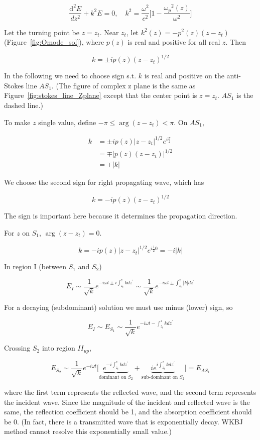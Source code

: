 \documentclass[
  notoc %
]{tufte-book}
\begin{document}
\[
\frac{\mathrm{d}^2 E}{dz^2} +k^2 E = 0,\quad k^2 = \frac{\omega^2}{c^2}\Big[ 1-\frac{{\omega_p}^2(z)}{\omega^2} \Big]
\]

Let the turning point be \(z=z_t\). Near \(z_t\), let
\(k^2(z)=-p^2(z)(z-z_t)\) (Figure~\ref{fig:Omode_sol}), where \(p(z)\)
is real and positive for all real \(z\). Then

\[
k=\pm i p(z)(z-z_t)^{1/2}
\]

In the following we need to choose sign s.t. \(k\) is real and positive
on the anti-Stokes line \(AS_1\). (The figure of complex z plane is the
same as Figure~\ref{fig:stokes_line_Zplane} except that the center point
is \(z=z_t\). \(AS_1\) is the dashed line.)

To make \(z\) single value, define \(-\pi\le\arg{(z-z_t)}<\pi\). On
\(AS_1\),

\[
\begin{aligned}
k &= \pm ip(z)|z-z_t|^{1/2} e^{i\frac{\pi}{2}} \\
&=\mp|p(z)(z-z_t)|^{1/2} \\
&=\mp |k|
\end{aligned}
\]

We choose the second sign for right propagating wave, which has

\[
k=-ip(z)(z-z_t)^{1/2}
\]

The sign is important here because it determines the propagation
direction.

For \(z\) on \(S_1\), \(\arg{(z-z_t)} = 0\).

\[
k=-ip(z)|z-z_t|^{1/2}e^{i\frac{1}{2}0}=-i|k|
\]

In region I (between \(S_1\) and \(S_2\))

\[
E_I \sim \frac{1}{\sqrt{k}}e^{-i\omega t\pm i\int_{z_t}^{z}kdz^\prime}\sim \frac{1}{\sqrt{k}}e^{-i\omega t\pm \int_{z_t}^z |k|dz^\prime}
\]

For a decaying (subdominant) solution we must use minus (lower) sign, so

\[
E_I \sim E_{S_1} \sim \frac{1}{\sqrt{k}}e^{-i\omega t- \int_{z_t}^z kdz^\prime}
\]

Crossing \(S_2\) into region \(II_{up}\),

\[
E_{S_2} \sim\frac{1}{\sqrt{k}}e^{-i\omega t}\Big[ \underbrace{e^{-i\int_{z_t}^z k dz^\prime}}_{\text{dominant on } S_2} + \underbrace{i e^{i\int_{z_t}^z kdz^\prime}}_{\text{sub-dominant on }S_2} \Big] = E_{AS_1}
\]

where the first term represents the reflected wave, and the second term
represents the incident wave. Since the magnitude of the incident and
reflected wave is the same, the reflection coefficient should be 1, and
the absorption coefficient should be 0. (In fact, there is a transmitted
wave that is exponentially decay. WKBJ method cannot resolve this
exponentially small value.)
\end{document}
